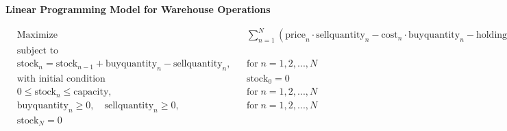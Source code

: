 \documentclass{article}
\begin{document}
\textbf{Linear Programming Model for Warehouse Operations}

\[
\begin{aligned}
& \text{Maximize} \quad && \sum_{n=1}^{N} \left( \text{price}_n \cdot \text{sellquantity}_n - \text{cost}_n \cdot \text{buyquantity}_n - \text{holding\_cost} \cdot \text{stock}_n \right) \\
& \text{subject to} \quad && \\
& \text{stock}_n = \text{stock}_{n-1} + \text{buyquantity}_n - \text{sellquantity}_n, && \text{for} \; n=1,2,...,N \\
& \text{with initial condition} \quad && \text{stock}_0 = 0 \\
& 0 \leq \text{stock}_n \leq \text{capacity}, && \text{for} \; n=1,2,...,N \\
& \text{buyquantity}_n \geq 0, \quad \text{sellquantity}_n \geq 0, && \text{for} \; n=1,2,...,N \\
& \text{stock}_N = 0
\end{aligned}
\]
\end{document}
